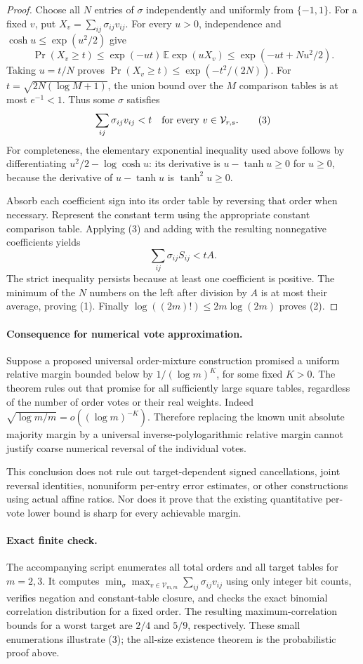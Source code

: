 \documentclass[11pt]{article}
\begin{document}
\begin{proof}
Choose all $N$ entries of $\sigma$ independently and uniformly from
$\{-1,1\}$. For a fixed $v$, put $X_v=\sum_{ij}\sigma_{ij}v_{ij}$.
For every $u>0$, independence and
$\cosh u\leq\exp(u^2/2)$ give
\[
 \Pr(X_v\geq t)
 \leq\exp(-ut)\,\mathbb E\exp(uX_v)
 \leq\exp(-ut+Nu^2/2).
\]
Taking $u=t/N$ proves
$\Pr(X_v\geq t)\leq\exp(-t^2/(2N))$.
For $t=\sqrt{2N(\log M+1)}$, the union bound over the $M$ comparison
tables is at most $e^{-1}<1$. Thus some $\sigma$ satisfies
\[
             \sum_{ij}\sigma_{ij}v_{ij}<t
             \quad\hbox{for every }v\in\mathcal V_{r,s}.       \tag{3}
\]
For completeness, the elementary exponential inequality used above
follows by differentiating $u^2/2-\log\cosh u$: its derivative is
$u-\tanh u\geq0$ for $u\geq0$, because the derivative of
$u-\tanh u$ is $\tanh^2u\geq0$.

Absorb each coefficient sign into its order table by reversing that
order when necessary. Represent the constant term using the appropriate
constant comparison table. Applying (3) and adding with the resulting
nonnegative coefficients yields
\[
       \sum_{ij}\sigma_{ij}S_{ij}<tA.
\]
The strict inequality persists because at least one coefficient is
positive. The minimum of the $N$ numbers on the left after division
by $A$ is at most their average, proving (1). Finally
$\log((2m)!)\leq2m\log(2m)$ proves (2).
\end{proof}

\paragraph{Consequence for numerical vote approximation.}
Suppose a proposed universal order-mixture construction promised a
uniform relative margin bounded below by $1/(\log m)^K$, for some
fixed $K>0$. The theorem rules out that promise for all sufficiently
large square tables, regardless of the number of order votes or their
real weights. Indeed
$\sqrt{\log m/m}=o((\log m)^{-K})$.
Therefore replacing the known unit absolute majority margin by a
universal inverse-polylogarithmic relative margin cannot justify
coarse numerical reversal of the individual votes.

This conclusion does not rule out target-dependent signed cancellations,
joint reversal identities, nonuniform per-entry error estimates, or
other constructions using actual affine ratios. Nor does it prove
that the existing quantitative per-vote lower bound is sharp for every
achievable margin.

\paragraph{Exact finite check.}
The accompanying script enumerates all total orders and all target
tables for $m=2,3$. It computes
$\min_\sigma\max_{v\in\mathcal V_{m,m}}\sum_{ij}\sigma_{ij}v_{ij}$
using only integer bit counts, verifies negation and constant-table
closure, and checks the exact binomial correlation distribution for a
fixed order. The resulting maximum-correlation bounds for a worst
target are $2/4$ and $5/9$, respectively. These small enumerations
illustrate (3); the all-size
existence theorem is the probabilistic proof above.
\end{document}
